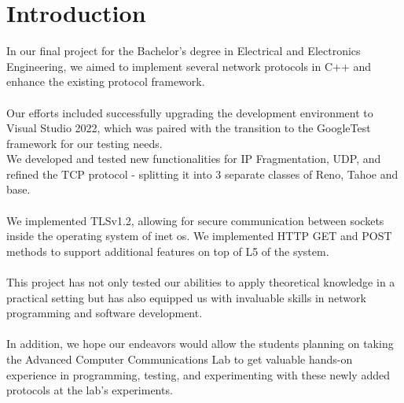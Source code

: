 \chapter{Introduction}
\large In our final project for the Bachelor’s degree in Electrical and Electronics Engineering, we aimed to implement several network protocols in C++ and enhance the existing protocol framework.\\\\Our efforts included successfully upgrading the development environment to Visual Studio 2022, which was paired with the transition to the GoogleTest framework for our testing needs.\\We developed and tested new functionalities for IP Fragmentation, UDP, and refined the  TCP protocol - splitting it into 3 separate classes of Reno, Tahoe and base.\\\\We implemented TLSv1.2, allowing for secure communication between sockets inside the operating system of inet os. We implemented HTTP GET and POST methods to support additional features on top of L5 of the system.\\\\This project has not only tested our abilities to apply theoretical knowledge in a practical setting but has also equipped us with invaluable skills in network programming and software development.\\\\In addition, we hope our endeavors would allow the students planning on taking the Advanced Computer Communications Lab to get valuable hands-on experience in programming, testing, and experimenting with these newly added protocols at the lab's experiments.